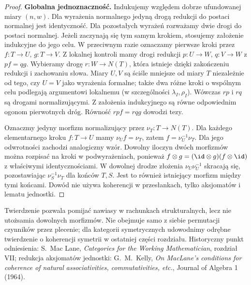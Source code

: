 \begin{proof}
\textbf{Globalna jednoznaczność.}
Indukujemy względem dobrze ufundowanej miary $(n,w)$. Dla wyrażenia normalnego jedyną drogą redukcji do postaci normalnej jest identyczność. Dla pozostałych wyrażeń rozważamy dwie drogi do postaci normalnej. Jeżeli zaczynają się tym samym krokiem, stosujemy założenie indukcyjne do jego celu. W przeciwnym razie oznaczamy pierwsze kroki przez $f:T\to U$, $g:T\to V$. Z lokalnej kontroli mamy drogi redukcji $p:U\to W$, $q:V\to W$ z $pf=qg$. Wybieramy drogę $r:W\to N(T)$, która istnieje dzięki zakończeniu redukcji i zachowaniu słowa. Miary $U,V$ są ściśle mniejsze od miary $T$ niezależnie od tego, czy $U=V$ jako wyrażenia formalne; także dwa różne kroki o wspólnym celu podlegają argumentowi lokalnemu (w szczególności $\lambda_I,\rho_I$). Wówczas $rp$ i $rq$ są drogami normalizującymi. Z założenia indukcyjnego są równe odpowiednim ogonom pierwotnych dróg. Równość $rpf=rqg$ dowodzi tezy.

Oznaczmy jedyny morfizm normalizujący przez $\nu_T:T\to N(T)$. Dla każdego elementarnego kroku $f:T\to U$ mamy $\nu_U f=\nu_T$, zatem $f=\nu_U^{-1}\nu_T$. Dla jego odwrotności zachodzi analogiczny wzór. Dowolny iloczyn dwóch morfizmów można rozpisać na kroki w podwyrażeniach, ponieważ $f\otimes g=(\id\otimes g)(f\otimes\id)$ z właściwymi identycznościami. W dowolnej drodze złożenia $\nu_U\nu_U^{-1}$ skracają się, pozostawiając $\nu_S^{-1}\nu_T$ dla końców $T,S$. Jest to również istniejący morfizm między tymi końcami. Dowód nie używa koherencji w przesłankach, tylko aksjomatów i lematu jednostki.
\end{proof}

\begin{uwaga}
Twierdzenie pozwala pomijać nawiasy w rachunkach strukturalnych, lecz nie utożsamia dowolnych morfizmów. Nie obejmuje samo z siebie permutacji czynników przez plecenie; dla kategorii symetrycznych udowodnimy odrębne twierdzenie o koherencji symetrii w ostatniej części rozdziału. Historyczny punkt odniesienia: S.~Mac Lane, \emph{Categories for the Working Mathematician}, rozdział VII; redukcja aksjomatów jednostki: G.~M.~Kelly, \emph{On MacLane's conditions for coherence of natural associativities, commutativities, etc.}, Journal of Algebra 1 (1964).
\end{uwaga}

